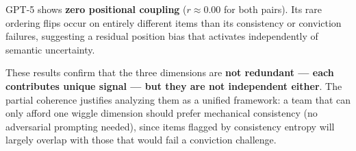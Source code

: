GPT-5 shows \textbf{zero positional coupling} ($r \approx 0.00$ for both pairs). Its rare ordering flips occur on entirely different items than its consistency or conviction failures, suggesting a residual position bias that activates independently of semantic uncertainty.

These results confirm that the three dimensions are \textbf{not redundant --- each contributes unique signal --- but they are not independent either}. The partial coherence justifies analyzing them as a unified framework: a team that can only afford one wiggle dimension should prefer mechanical consistency (no adversarial prompting needed), since items flagged by consistency entropy will largely overlap with those that would fail a conviction challenge.
